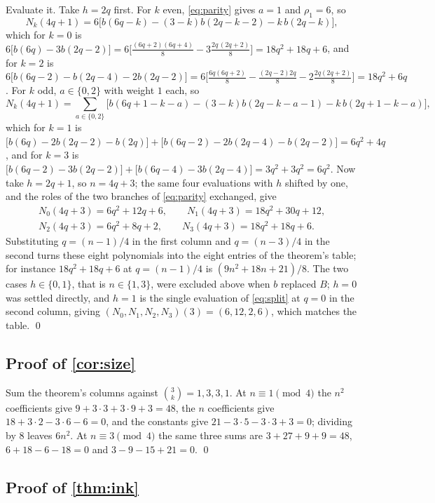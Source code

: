 \documentclass[11pt]{amsart}
\theoremstyle{definition}
\theoremstyle{remark}
\begin{document}
Evaluate it. Take $h = 2q$ first. For $k$ even, \cref{eq:parity} gives $a = 1$ and $\rho_1 = 6$, so
\[
N_k(4q+1) = 6\bigl[b(6q-k) - (3-k)b(2q-k-2) - k\,b(2q-k)\bigr],
\]
which for $k=0$ is $6\bigl[b(6q) - 3b(2q-2)\bigr] = 6\bigl[\tfrac{(6q+2)(6q+4)}{8} - 3\tfrac{2q\,(2q+2)}{8}\bigr] = 18q^2+18q+6$, and for $k=2$ is $6\bigl[b(6q-2) - b(2q-4) - 2b(2q-2)\bigr] = 6\bigl[\tfrac{6q(6q+2)}{8} - \tfrac{(2q-2)2q}{8} - 2\tfrac{2q(2q+2)}{8}\bigr] = 18q^2+6q$. For $k$ odd, $a \in \{0,2\}$ with weight $1$ each, so
\[
N_k(4q+1) = \sum_{a \in \{0,2\}}\bigl[b(6q+1-k-a) - (3-k)b(2q-k-a-1) - k\,b(2q+1-k-a)\bigr],
\]
which for $k=1$ is $\bigl[b(6q) - 2b(2q-2) - b(2q)\bigr] + \bigl[b(6q-2) - 2b(2q-4) - b(2q-2)\bigr] = 6q^2+4q$, and for $k=3$ is $\bigl[b(6q-2) - 3b(2q-2)\bigr] + \bigl[b(6q-4) - 3b(2q-4)\bigr] = 3q^2 + 3q^2 = 6q^2$. Now take $h = 2q+1$, so $n = 4q+3$; the same four evaluations with $h$ shifted by one, and the roles of the two branches of \cref{eq:parity} exchanged, give
\[
\begin{gathered}
N_0(4q+3) = 6q^2+12q+6, \qquad N_1(4q+3) = 18q^2+30q+12,\\
N_2(4q+3) = 6q^2+8q+2, \qquad N_3(4q+3) = 18q^2+18q+6 .
\end{gathered}
\]
Substituting $q = (n-1)/4$ in the first column and $q = (n-3)/4$ in the second turns these eight polynomials into the eight entries of the theorem's table; for instance $18q^2+18q+6$ at $q = (n-1)/4$ is $(9n^2+18n+21)/8$. The two cases $h \in \{0,1\}$, that is $n \in \{1,3\}$, were excluded above when $b$ replaced $B$; $h=0$ was settled directly, and $h=1$ is the single evaluation of \cref{eq:split} at $q=0$ in the second column, giving $(N_0,N_1,N_2,N_3)(3) = (6,12,2,6)$, which matches the table. \qed

\subsection*{Proof of \cref{cor:size}}

Sum the theorem's columns against $\binom3k = 1,3,3,1$. At $n \equiv 1 \pmod 4$ the $n^2$ coefficients give $9 + 3\cdot3 + 3\cdot9 + 3 = 48$, the $n$ coefficients give $18 + 3\cdot2 - 3\cdot6 - 6 = 0$, and the constants give $21 - 3\cdot5 - 3\cdot3 + 3 = 0$; dividing by $8$ leaves $6n^2$. At $n \equiv 3 \pmod 4$ the same three sums are $3 + 27 + 9 + 9 = 48$, $6 + 18 - 6 - 18 = 0$ and $3 - 9 - 15 + 21 = 0$. \qed

\subsection*{Proof of \cref{thm:ink}}
\end{document}
